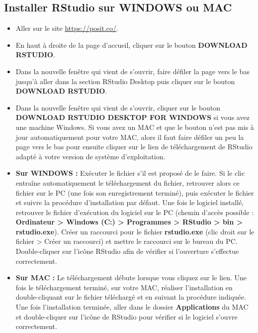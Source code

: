 \documentclass[
]{book}
\providecommand{\tightlist}{%
  \setlength{\itemsep}{0pt}\setlength{\parskip}{0pt}}
\begin{document}
\hypertarget{installer-rstudio-sur-windows-ou-mac}{%
\subsection{Installer RStudio sur WINDOWS ou MAC}\label{installer-rstudio-sur-windows-ou-mac}}

\begin{itemize}
\tightlist
\item
  Aller sur le site \url{https://posit.co/}.
\item
  En haut à droite de la page d'accueil, cliquer sur le bouton \textbf{DOWNLOAD RSTUDIO}.
\item
  Dans la nouvelle fenêtre qui vient de s'ouvrir, faire défiler la page vers le bas jusqu'à aller dans la section RStudio Desktop puis cliquer sur le bouton \textbf{DOWNLOAD RSTUDIO}.
\item
  Dans la nouvelle fenêtre qui vient de s'ouvrir, cliquer sur le bouton \textbf{DOWNLOAD RSTUDIO DESKTOP FOR WINDOWS} si vous avez une machine Windows. Si vous avez un MAC et que le bouton n'est pas mis à jour automatiquement pour votre MAC, alors il faut faire défiler un peu la page vers le bas pour ensuite cliquer sur le lien de téléchargement de RStudio adapté à votre version de système d'exploitation.
\item
  \textbf{Sur WINDOWS :} Exécuter le fichier s'il est proposé de le faire. Si le clic entraîne automatiquement le téléchargement du fichier, retrouver alors ce fichier sur le PC (une fois son enregistrement terminé), puis exécuter le fichier et suivre la procédure d'installation par défaut. Une fois le logiciel installé, retrouver le fichier d'exécution du logiciel sur le PC (chemin d'accès possible : \textbf{Ordinateur \textgreater{} Windows (C:) \textgreater{} Programmes \textgreater{} RStudio \textgreater{} bin \textgreater{} rstudio.exe}). Créer un raccourci pour le fichier \textbf{rstudio.exe} (clic droit sur le fichier \textgreater{} Créer un raccourci) et mettre le raccourci sur le bureau du PC. Double-cliquer sur l'icône RStudio afin de vérifier si l'ouverture s'effectue correctement.
\item
  \textbf{Sur MAC :} Le téléchargement débute lorsque vous cliquez sur le lien. Une fois le téléchargement terminé, sur votre MAC, réaliser l'installation en double-cliquant sur le fichier téléchargé et en suivant la procédure indiquée. Une fois l'installation terminée, aller dans le dossier \textbf{Applications} du MAC et double-cliquer sur l'icône de RStudio pour vérifier si le logiciel s'ouvre correctement.
\end{itemize}
\end{document}
